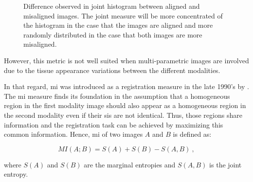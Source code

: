 \begin{figure}
\centering
	\hspace*{\fill}
	 \hfill
	\hspace*{\fill}
	\caption{Difference observed in joint histogram between aligned and misaligned images. The joint measure will be more concentrated of the histogram in the case that the images are aligned and more randomly distributed in the case that both images are more misaligned.}
\end{figure}

However, this metric is not well suited when multi-parametric images are involved due to the tissue appearance variations between the different modalities.

In that regard, \ac{mi} was introduced as a registration measure in the late 1990's by \cite{Pluim2003}. The \ac{mi} measure finds its foundation in the assumption that a homogeneous region in the first modality image should also appear as a homogeneous region in the second modality even if their \acp{si} are not identical. Thus, those regions share information and the registration task can be achieved by maximizing this common information. Hence, \Ac{mi} of two images $A$ and $B$ is defined as:

\begin{equation}
	MI(A;B) = S(A) + S(B) - S(A,B) \ ,
	\label{eq:midef}
\end{equation}

\noindent where $S(A)$ and $S(B)$ are the marginal entropies and $S(A,B)$ is the joint entropy.

